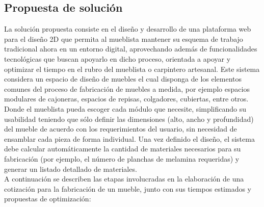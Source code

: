 ﻿\documentclass{iccmemoria}
\begin{document}
\subsection{Propuesta de solución}
\begingroup
La solución propuesta consiste en el diseño y desarrollo de una plataforma web para el diseño 2D que permita al mueblista mantener su esquema de trabajo tradicional ahora en un entorno digital, aprovechando además de funcionalidades tecnológicas que buscan apoyarlo en dicho proceso, orientada a apoyar y optimizar el tiempo en el rubro del mueblista o carpintero artesanal. Este sistema considera un espacio de diseño de muebles el cual disponga de los elementos comunes del proceso de fabricación de muebles a medida, por ejemplo espacios modulares de cajoneras, espacios de repisas, colgadores, cubiertas, entre otros. Donde el mueblista pueda escoger cada módulo que necesite, simplificando su usabilidad teniendo que sólo definir las dimensiones (alto, ancho y profundidad) del mueble de acuerdo con los requerimientos del usuario, sin necesidad de ensamblar cada pieza de forma individual. Una vez definido el diseño, el sistema debe calcular automáticamente la cantidad de materiales necesarios para su fabricación (por ejemplo, el número de planchas de melamina requeridas) y generar un listado detallado de materiales.\\

A continuación se describen las etapas involucradas en la elaboración de una cotización para la fabricación de un mueble, junto con sus tiempos estimados y propuestas de optimización:
\end{document}
